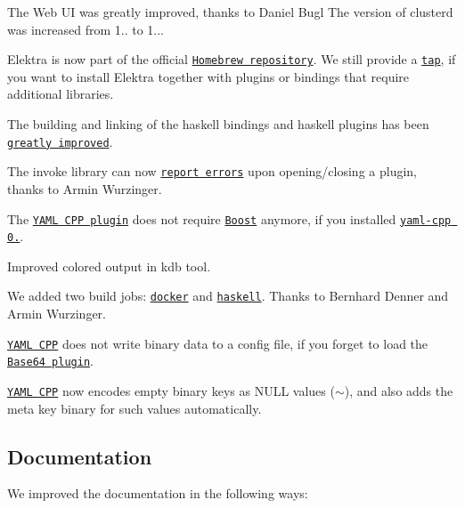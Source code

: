 \begin{DoxyItemize}
\item The Web UI was greatly improved, thanks to Daniel Bugl The version of clusterd was increased from 1.. to 1...
\item Elektra is now part of the official \href{http://formulae.brew.sh/formula/elektra}{\tt Homebrew repository}. We still provide a \href{http://github.com/ElektraInitiative/homebrew-elektra}{\tt tap}, if you want to install Elektra together with plugins or bindings that require additional libraries.
\item The building and linking of the haskell bindings and haskell plugins has been \href{https://github.com/ElektraInitiative/libelektra/pull/1698}{\tt greatly improved}.
\item The invoke library can now \href{https://github.com/ElektraInitiative/libelektra/pull/1801}{\tt report errors} upon opening/closing a plugin, thanks to Armin Wurzinger.
\item The \href{https://www.libelektra.org/plugins/yamlcpp}{\tt Y\+A\+ML C\+PP plugin} does not require \href{http://www.boost.org}{\tt Boost} anymore, if you installed \href{https://github.com/jbeder/yaml-cpp/releases/tag/yaml-cpp-0.6.0}{\tt yaml-\/cpp 0.}.
\item Improved colored output in {\ttfamily kdb} tool.
\item We added two build jobs\+: \href{https://build.libelektra.org/job/test-docker/}{\tt docker} and \href{https://build.libelektra.org/job/elektra-haskell/}{\tt haskell}. Thanks to Bernhard Denner and Armin Wurzinger.
\item \href{https://www.libelektra.org/plugins/yamlcpp}{\tt Y\+A\+ML C\+PP} does not write binary data to a config file, if you forget to load the \href{https://www.libelektra.org/plugins/base64}{\tt Base64 plugin}.
\item \href{https://www.libelektra.org/plugins/yamlcpp}{\tt Y\+A\+ML C\+PP} now encodes empty binary keys as N\+U\+LL values ({\ttfamily $\sim$}), and also adds the meta key {\ttfamily binary} for such values automatically.
\end{DoxyItemize}

\subsection*{Documentation}

We improved the documentation in the following ways\+:


